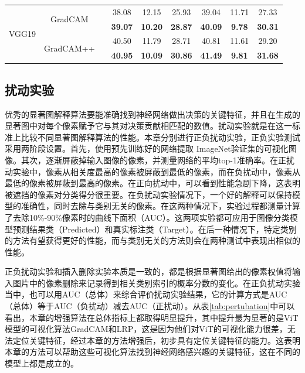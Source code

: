 \begin{table}[!ht]
{\begin{tabular}{ccccccccc}
			\hline
			\multirow{4}{*}{VGG19} & \multirow{2}{*}{GradCAM}                 &                       & 38.08          & 12.15          & 25.93          & 39.04          & 11.71          & 27.33           \\ 
			\cline{4-9}
			&                                          & \checkmark                     & \textbf{39.07} & \textbf{10.20} & \textbf{28.87} & \textbf{40.09} & \textbf{9.78}  & \textbf{30.31}  \\ 
			\cline{2-9}
			& \multirow{2}{*}{GradCAM++}               &                       & 40.50          & 11.79          & 28.71          & 40.81          & 11.61          & 29.20           \\ 
			\cline{4-9}
			&                                          & \checkmark                     & \textbf{40.95} & \textbf{10.09} & \textbf{30.86} & \textbf{41.49} & \textbf{9.81}  & \textbf{31.68}  \\
			\hline
		\end{tabular}
	}
\end{table}
\subsection{扰动实验}
优秀的显著图解释算法要能准确找到神经网络做出决策的关键特征，并且在生成的显著图中对每个像素赋予它与其对决策贡献相匹配的数值。扰动实验就是在这一标准上比较不同显著图解释算法的性能。本章分别进行正负扰动实验，正负实验测试采用两阶段设置。首先，使用预先训练好的网络提取 ImageNet验证集的可视化图像。其次，逐渐屏蔽掉输入图像的像素，并测量网络的平均top-1准确率。在正扰动实验中，像素从相关度最高的像素被屏蔽到最低的像素，而在负扰动中，像素从最低的像素被屏蔽到最高的像素。在正向扰动中，可以看到性能急剧下降，这表明被遮挡的像素对分类得分很重要。在负扰动实验情况下，一个好的解释可以保持模型的准确性，同时去除与类别无关的像素。在这两种情况下，实验过程都测量计算了去除10\%-90\%像素时的曲线下面积（AUC）。这两项实验都可应用于图像分类模型预测结果类（Predicted）和真实标注类（Target）。在后一种情况下，特定类别的方法有望获得更好的性能，而与类别无关的方法则会在两种测试中表现出相似的性能。

正负扰动实验和插入删除实验本质是一致的，都是根据显著图给出的像素权值将输入图片中的像素删除来记录得到相关类别索引的概率分数的变化。在正负扰动实验当中，也可以用AUC（总体）来综合评价扰动实验结果，它的计算方式是AUC（总体）等于AUC（负扰动）减去AUC（正扰动）。从表\ref{tab:pertubation}中可以看出，本章的增强算法在总体指标上都取得明显提升，其中提升最为显著的是ViT模型的可视化算法GradCAM和LRP，这是因为他们对ViT的可视化能力很差，无法定位关键特征，经过本章的方法增强后，初步具有定位关键特征的能力。这表明本章的方法可以帮助这些可视化算法找到神经网络感兴趣的关键特征，这在不同的模型上都是成立的。

